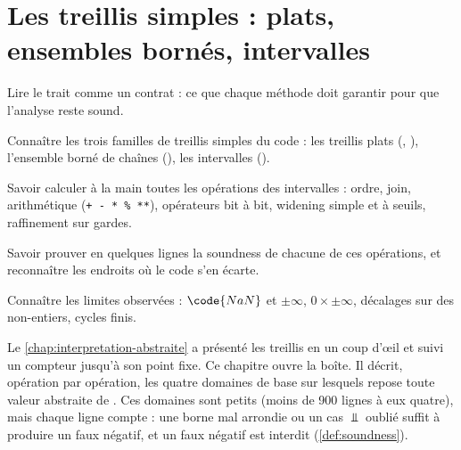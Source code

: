 \chapter{Les treillis simples : plats, ensembles bornés, intervalles}
\label{chap:treillis-simples}

\begin{objectifs}
  \item Lire le trait  comme un contrat : ce que chaque méthode doit garantir pour que l'analyse reste sound.
  \item Connaître les trois familles de treillis \og simples\fg{} du code : les treillis plats (, ), l'ensemble borné de chaînes (), les intervalles ().
  \item Savoir calculer à la main toutes les opérations des intervalles : ordre, join, arithmétique (\texttt{+ - * \% **}), opérateurs bit à bit, widening simple et à seuils, raffinement sur gardes.
  \item Savoir prouver en quelques lignes la soundness de chacune de ces opérations, et reconnaître les endroits où le code s'en écarte.
  \item Connaître les limites observées : $\code{NaN}$ et $\pm\infty$, $0 \times \pm\infty$, décalages sur des non-entiers, cycles finis.
\end{objectifs}


Le \cref{chap:interpretation-abstraite} a présenté les treillis \og en un coup
d'œil\fg{} et suivi un compteur jusqu'à son point fixe. Ce chapitre ouvre la
boîte. Il décrit, opération par opération, les quatre domaines de base sur
lesquels repose toute valeur abstraite de \reactant{}. Ces domaines sont
petits (moins de 900 lignes à eux quatre), mais chaque ligne compte : une
borne mal arrondie ou un cas $\Bot$ oublié suffit à produire un faux négatif,
et un faux négatif est interdit (\cref{def:soundness}).

